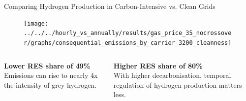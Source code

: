 \begin{frame}{Comparing Hydrogen Production in Carbon-Intensive vs. Clean Grids}
	\begin{figure}
		\centering
		\texttt{[image: ../../../hourly\_vs\_annually/results/gas\_price\_35\_nocrossover/graphs/consequential\_emissions\_by\_carrier\_3200\_cleanness]}
	\end{figure}
	\begin{columns}[T]
		\begin{column}{0.48\textwidth}
			\centering
			\textbf{Lower RES share of 49\%} \\
			\alert{Emissions} can \alert{rise} to nearly \alert{4x} the intensity of \alert{grey hydrogen}.
		\end{column}
		
		\begin{column}{0.48\textwidth}
			\centering
			\textbf{Higher RES share of 80\%} \\
			With \alert{higher decarbonisation}, temporal \alert{regulation} of hydrogen production matters \alert{less}.
			
		\end{column}
	\end{columns}
\end{frame}

